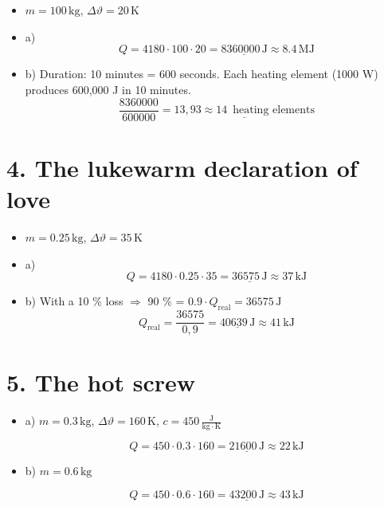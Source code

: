 \documentclass[a4paper]{article}
\begin{document}
		\begin{itemize}
			\item \( m = 100\,\text{kg} \),
			\( \Delta \vartheta = 20\,\text{K} \)
			
			\item a)
			\[
			Q = 4180 \cdot 100 \cdot 20 = \underline{8360000\,\text{J}}\approx 8.4\, \text{MJ}
			\]
			
			\item b) Duration: 10 minutes = 600 seconds.
			Each heating element (1000 W) produces 600,000 J in 10 minutes.
			\[
			\frac{8360000}{600000} = \underline{13{,}93 \approx 14 \,\text{ heating elements}}
			\]
		\end{itemize}
		
		\hrulefill
		
		\section*{4. The lukewarm declaration of love}
		
		\begin{itemize}
			\item \( m = 0.25\,\text{kg} \),
			\( \Delta \vartheta = 35\,\text{K} \)
			
			\item a)
			\[
			Q = 4180 \cdot 0.25 \cdot 35 = \underline{36575\,\text{J}}\approx 37 \,\text{kJ}
			\]
			\item b) With a 10 \% loss $\Rightarrow$ 90 \% = \( 0.9 \cdot Q_\text{real} = 36575\,\text{J} \)
			\[
			Q_\text{real} = \frac{36575}{0{,}9} = \underline{40639\,\text{J}}\approx 41 \,\text{kJ}
			\]
		\end{itemize}
		
		
		\section*{5. The hot screw }
		
		\begin{itemize}
			\item a) \( m = 0{.}3\,\mathrm{kg} \), \( \Delta \vartheta = 160\,\mathrm{K} \), \( c = 450 \,\frac{\mathrm{J}}{\mathrm{kg}\cdot\mathrm{K}}\)
			
			\[
			Q = 450 \cdot 0{.}3 \cdot 160 = \underline{21600\,\text{J}}\approx 22 \,\text{kJ}
			\]
			
			\item b) \( m = 0{.}6\,\text{kg} \)
			
			\[
			Q = 450 \cdot 0{.}6 \cdot 160 = \underline{43200\,\text{J}}\approx 43\, \text{kJ}
			\]
		\end{itemize}
		
\end{document}
